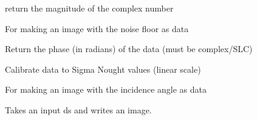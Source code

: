 \documentclass[letterpaper,10pt,english]{sphinxmanual}
\begin{document}
\begin{fulllineitems}
\begin{fulllineitems}
\end{fulllineitems}


\begin{fulllineitems}
\label{code:Image.Image.getMag}
return the magnitude of the complex number

\end{fulllineitems}


\begin{fulllineitems}
\label{code:Image.Image.getNoise}
For making an image with the noise floor as data

\end{fulllineitems}


\begin{fulllineitems}
\label{code:Image.Image.getPhase}
Return the phase (in radians) of the data (must be complex/SLC)

\end{fulllineitems}


\begin{fulllineitems}
\label{code:Image.Image.getSigma}
Calibrate data to Sigma Nought values (linear scale)

\end{fulllineitems}


\begin{fulllineitems}
\label{code:Image.Image.getTheta}
For making an image with the incidence angle as data

\end{fulllineitems}


\begin{fulllineitems}
\label{code:Image.Image.imgWrite}
Takes an input ds and writes an image.


\end{fulllineitems}
\end{fulllineitems}
\end{document}
